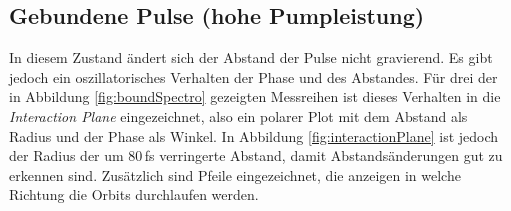 \documentclass[bachelor,       %
               twoside,        %
               BCOR10mm,       %
               english,ngerman, %
               ]{GAUBM}
\begin{document}
\subsection{Gebundene Pulse (hohe Pumpleistung)}
In diesem Zustand ändert sich der Abstand der Pulse nicht gravierend.
Es gibt jedoch ein oszillatorisches Verhalten der Phase und des Abstandes.
Für drei der in Abbildung \ref{fig:boundSpectro} gezeigten Messreihen ist dieses Verhalten in die \textit{Interaction Plane} eingezeichnet, also ein polarer Plot mit dem Abstand als Radius und der Phase als Winkel.
In Abbildung \ref{fig:interactionPlane} ist jedoch der Radius der um 80\,fs verringerte Abstand, damit Abstandsänderungen gut zu erkennen sind.
Zusätzlich sind Pfeile eingezeichnet, die anzeigen in welche Richtung die Orbits durchlaufen werden.
\begin{figure}[!htb]
   \centering
   \captionsetup[subfigure]{labelformat=empty}
   \captionsetup[subfloat]{farskip=-10pt,captionskip=0pt}
   \hfill
   

\end{figure}
\end{document}
